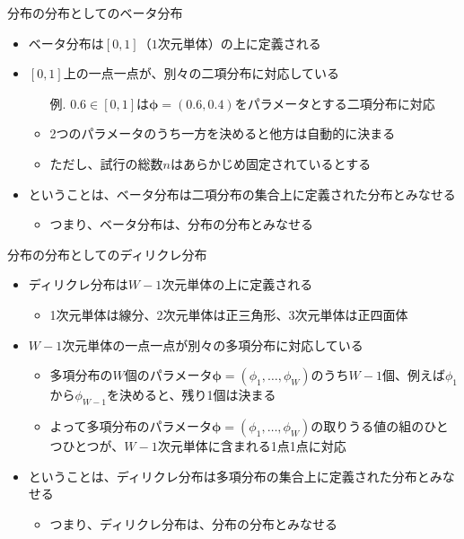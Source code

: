 \documentclass[aspectratio=169,unicode,dvipdfmx,14pt]{beamer}
\begin{document}
\begin{frame}{分布の分布としてのベータ分布}
\begin{itemize}
\item ベータ分布は$[0,1]$（$1$次元単体）の上に定義される
\item $[0,1]$上の一点一点が、別々の二項分布に対応している
\begin{itemize}
\item[例.] $0.6\in[0,1]$は$\bm{\phi}=(0.6,0.4)$をパラメータとする二項分布に対応
\item 2つのパラメータのうち一方を決めると他方は自動的に決まる
\item ただし、試行の総数$n$はあらかじめ固定されているとする
\end{itemize}
\item ということは、ベータ分布は二項分布の集合上に定義された分布とみなせる
\begin{itemize}
\item つまり、ベータ分布は、分布の分布とみなせる
\end{itemize}
\end{itemize}
\end{frame}

\begin{frame}{分布の分布としてのディリクレ分布}
\begin{itemize}
\item ディリクレ分布は$W-1$次元単体の上に定義される
\begin{itemize}
\item 1次元単体は線分、2次元単体は正三角形、3次元単体は正四面体
\end{itemize}
\item $W-1$次元単体の一点一点が別々の多項分布に対応している
\begin{itemize}
\item 多項分布の$W$個のパラメータ$\bm{\phi}=(\phi_1,\ldots,\phi_W)$のうち$W-1$個、例えば$\phi_1$から$\phi_{W-1}$を決めると、残り1個は決まる
\item よって多項分布のパラメータ$\bm{\phi}=(\phi_1,\ldots,\phi_W)$の取りうる値の組のひとつひとつが、$W-1$次元単体に含まれる1点1点に対応
\end{itemize}
\item ということは、ディリクレ分布は多項分布の集合上に定義された分布とみなせる
\begin{itemize}
\item つまり、ディリクレ分布は、分布の分布とみなせる
\end{itemize}
\end{itemize}
\end{frame}
\end{document}
